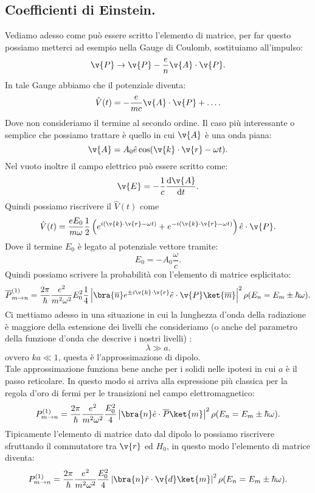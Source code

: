 \subsection{Coefficienti di Einstein.}%
\label{sub:Coefficienti di Einstein.}
Vediamo adesso come può essere scritto l'elemento di matrice, per far questo possiamo metterci ad esempio nella Gauge di Coulomb, sostituiamo all'impulso:
\[
    \v{P} \to 
\v{P}- \frac{e}{n}\v{A}\cdot \v{P}
.\] 
In tale Gauge abbiamo che il potenziale diventa:
\[
    \hat{V}(t) = -\frac{e}{mc}\v{A}\cdot \v{P} + \ldots
.\] 
Dove non consideriamo il termine al secondo ordine. Il caso più interessante o semplice che possiamo trattare è quello in cui $\v{A}$ è una onda piana:
\[
    \v{A}=A_0 \hat{e}\cos(\v{k}\cdot \v{r}-\omega t) 
.\] 
Nel vuoto inoltre il campo elettrico può essere scritto come:
\[
\v{E}= -\frac{1}{c}\frac{\text{d} \v{A}}{\text{d} t} 
.\] 
Quindi possiamo riscrivere il $\hat{V}(t) $  come 
\[
    \hat{V}(t) = \frac{eE_0}{m\omega} \frac{1}{2}\left(e^{i(\v{k}\cdot \v{r}-\omega t)} + e^{-i(\v{k}\cdot \v{r}-\omega t) }\right) \hat{e}\cdot \v{P}
.\] 
Dove il termine $E_0$  è legato al potenziale vettore tramite:
\[
E_0=-A_0 \frac{\omega}{c}
.\] 
Quindi possiamo scrivere la probabilità con l'elemento di matrice esplicitato:
\[
    \overline{P}^{(1)}_{m\to n}=
    \frac{2\pi}{\hbar }\frac{e^2}{m^2\omega^2}E_0^2 \frac{1}{4}
    \left|
    \bra{\overline{n}}
    e^{\pm i \v{k}\cdot \v{r}}\hat{e}\cdot \v{P} 
    \ket{\overline{m}}
    \right|^2\rho(E_n = E_m \pm \hbar \omega) 
.\] 
Ci mettiamo adesso in una situazione in cui la lunghezza d'onda della radiazione è maggiore della estensione dei livelli che consideriamo (o anche del parametro della funzione d'onda che descrive i nostri livelli) :
\[
\lambda  \gg a
.\] 
ovvero $ka \ll 1$, questa è l'approssimazione di dipolo. \\
Tale approssimazione funziona bene anche per i solidi nelle ipotesi in cui $a$ è il passo reticolare. In questo modo si arriva alla espressione più classica per la regola d'oro di fermi per le transizioni nel campo elettromagnetico:
\[
    P^{(1) }_{m\to n}= 
    \frac{2\pi}{\hbar }\frac{e^2}{m^2\omega^2}\frac{E_0^2}{4}
    \left|\bra{n}\hat{e}\cdot \overline{P} \ket{m}\right|^2
    \rho(E_n=E_m \pm \hbar \omega) 
.\] 
Tipicamente l'elemento di matrice dato dal dipolo lo possiamo riscrivere sfruttando il commutatore tra $\v{r}$ ed $H_0$, in questo modo l'elemento di matrice diventa:
\[
    P^{(1) }_{m\to n}= 
    \frac{2\pi}{\hbar }\frac{e^2}{m^2\omega^2}\frac{E_0^2}{4}
    \left|\bra{n}\hat{r}\cdot \v{d} \ket{m}\right|^2
    \rho(E_n=E_m \pm \hbar \omega) 
.\] 
